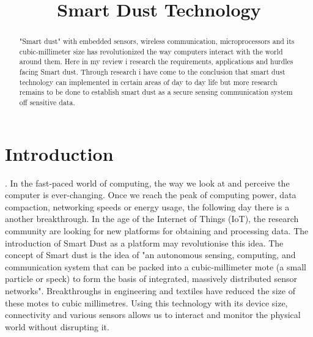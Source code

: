 \documentclass[article]{IEEEtran}
\begin{document}
\title{Smart Dust Technology }
\author
{
}

\maketitle

\begin{abstract}
"Smart dust" with embedded sensors, wireless communication, microprocessors and its cubic-millimeter size has revolutionized the way computers interact with the world around them. Here in my review i research the requirements, applications and hurdles facing Smart dust. Through research i have come to the conclusion that smart dust technology can implemented in certain areas of day to day life but more research remains to be done to establish smart dust as a secure sensing communication system off sensitive data. 
\end{abstract}


\section{Introduction}.\newline
In the fast-paced world of computing, the way we look at and perceive the computer is ever-changing. Once we reach the peak of computing power, data compaction, networking speeds or energy usage, the following day there is a another breakthrough. In the age of the Internet of Things (IoT)\cite{Lightweight}, the research community are looking for new platforms for obtaining and processing data. The introduction of Smart Dust as a platform may revolutionise this idea. 
The concept of Smart dust is the idea of  "an autonomous sensing, computing, and communication system that can be packed into a cubic-millimeter mote (a small particle or speck) to form the basis of integrated, massively distributed sensor networks"\cite{Mili}. Breakthroughs in engineering and textiles have reduced the size of these motes to cubic millimetres\cite{textiles}. Using this technology with its device size, connectivity and various sensors allows us to interact and monitor the physical world without disrupting it.\cite{MobNet}
\end{document}
